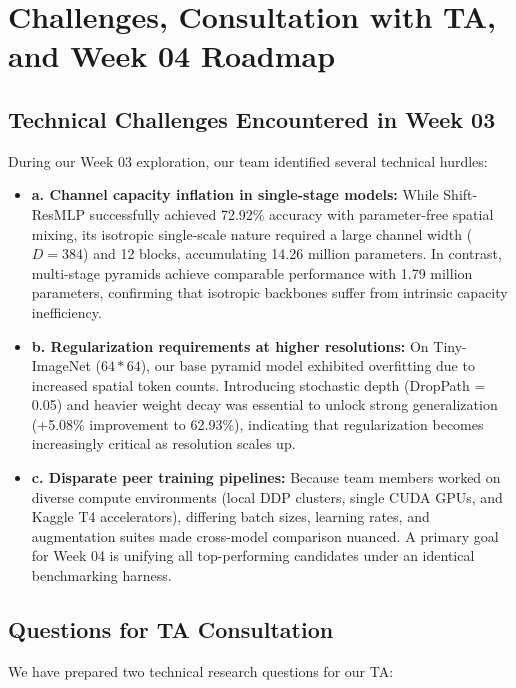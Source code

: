 \section{Challenges, Consultation with TA, and Week 04 Roadmap}
\label{section:roadmap}

\subsection{Technical Challenges Encountered in Week 03}
During our Week 03 exploration, our team identified several technical hurdles:
\begin{itemize}
    \item \textbf{a. Channel capacity inflation in single-stage models:} While Shift-ResMLP successfully achieved 72.92\% accuracy with parameter-free spatial mixing, its isotropic single-scale nature required a large channel width ($D = 384$) and 12 blocks, accumulating 14.26 million parameters. In contrast, multi-stage pyramids achieve comparable performance with 1.79 million parameters, confirming that isotropic backbones suffer from intrinsic capacity inefficiency.
    \item \textbf{b. Regularization requirements at higher resolutions:} On Tiny-ImageNet ($64*64$), our base pyramid model exhibited overfitting due to increased spatial token counts. Introducing stochastic depth (DropPath = 0.05) and heavier weight decay was essential to unlock strong generalization (+5.08\% improvement to 62.93\%), indicating that regularization becomes increasingly critical as resolution scales up.
    \item \textbf{c. Disparate peer training pipelines:} Because team members worked on diverse compute environments (local DDP clusters, single CUDA GPUs, and Kaggle T4 accelerators), differing batch sizes, learning rates, and augmentation suites made cross-model comparison nuanced. A primary goal for Week 04 is unifying all top-performing candidates under an identical benchmarking harness.
\end{itemize}

\subsection{Questions for TA Consultation}
We have prepared two technical research questions for our TA:

